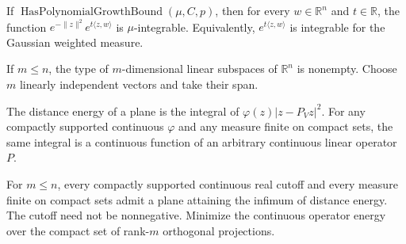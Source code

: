 \begin{lemma}
\label{lem:gaussian-weight-exponential}

If $\operatorname{HasPolynomialGrowthBound}(\mu,C,p)$, then for every $w\in\mathbb R^n$ and $t\in\mathbb R$, the function $e^{-\|z\|^2}e^{t\langle z,w\rangle}$ is $\mu$-integrable. Equivalently, $e^{t\langle z,w\rangle}$ is integrable for the Gaussian weighted measure.
\end{lemma}

\begin{lemma}
\label{lem:plane-exists}

If $m\leq n$, the type of $m$-dimensional linear subspaces of $\mathbb R^n$ is nonempty. Choose $m$ linearly independent vectors and take their span.
\end{lemma}

\begin{lemma}
\label{lem:projection-energy-continuity}

The distance energy of a plane is the integral of $\varphi(z)|z-P_Vz|^2$. For any compactly supported continuous $\varphi$ and any measure finite on compact sets, the same integral is a continuous function of an arbitrary continuous linear operator $P$.
\end{lemma}

\begin{lemma}
\label{lem:flatness-minimizer-finite-compacts}

For $m\leq n$, every compactly supported continuous real cutoff and every measure finite on compact sets admit a plane attaining the infimum of distance energy. The cutoff need not be nonnegative. Minimize the continuous operator energy over the compact set of rank-$m$ orthogonal projections.
\end{lemma}

